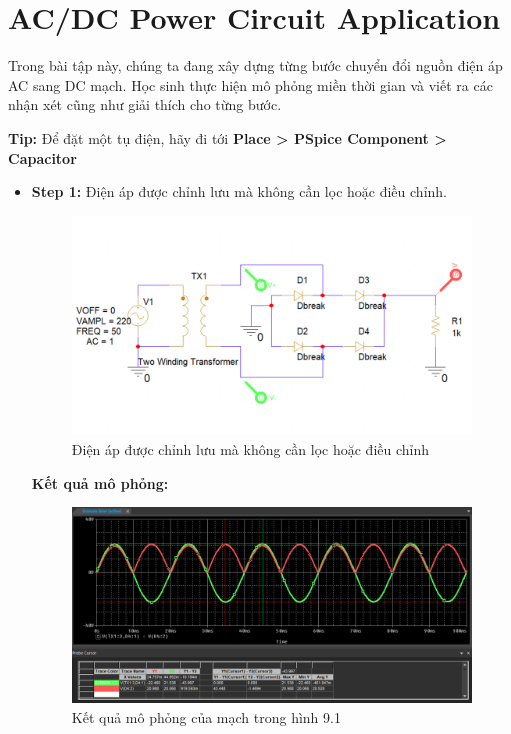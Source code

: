 \section{AC/DC Power Circuit Application}
Trong bài tập này, chúng ta đang xây dựng từng bước chuyển đổi nguồn điện áp AC sang DC
mạch. Học sinh thực hiện mô phỏng miền thời gian và viết ra các nhận xét cũng như giải thích cho từng bước.

\textbf{Tip:} Để đặt một tụ điện, hãy đi tới  \textbf{Place > PSpice Component > Capacitor}
\begin{itemize}
    \item \textbf{Step 1:} Điện áp được chỉnh lưu mà không cần lọc hoặc điều chỉnh.
    \begin{figure}[ht]
        \centering
        \includegraphics[scale= 0.26]{graphics/ex9/f1.png}
        \caption{Điện áp được chỉnh lưu mà không cần lọc hoặc điều chỉnh}
    \end{figure}
\pagebreak
    \textbf{Kết quả mô phỏng: }

    \begin{figure}[ht]
        \centering
        \includegraphics[scale= 0.2]{graphics/ex9/f2.png}
        \caption{Kết quả mô phỏng của mạch trong hình 9.1}
    \end{figure}


\end{itemize}

